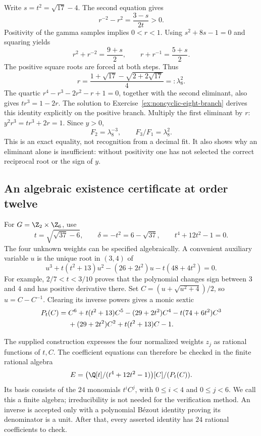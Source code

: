 Write $s=t^2=\sqrt{17}-4$. The second equation gives
\[
 r^{-2}-r^2=\frac{3-s}{2t}>0.
\]
Positivity of the gamma samples implies $0<r<1$. Using
$s^2+8s-1=0$ and squaring yields
\[
 r^2+r^{-2}=\frac{9+s}{2},\qquad
 r+r^{-1}=\frac{5+s}{2}.
\]
The positive square roots are forced at both steps. Thus
\begin{equation}
 r=\frac{1+\sqrt{17}-\sqrt{2+2\sqrt{17}}}{4}
 =:\lambda_8^2.
 \label{eq:noncyclic-lambda8}
\end{equation}
The quartic
$r^4-r^3-2r^2-r+1=0$, together with the second eliminant,
also gives $tr^3=1-2r$. The solution to
Exercise~\ref{ex:noncyclic-eight-branch} derives this identity
explicitly on the positive branch. Multiply the first eliminant by $r$:
$y^2r^3=tr^3+2r=1$. Since $y>0$,
\begin{equation}
 F_2=\lambda_8^{-3},\qquad F_3/F_1=\lambda_8^2.
 \label{eq:noncyclic-eight-gamma}
\end{equation}
This is an exact equality, not recognition from a decimal fit.
It also shows why an eliminant alone is insufficient: without
positivity one has not selected the correct reciprocal root or
the sign of $y$.

\subsection{An algebraic existence certificate at order twelve}

For $G=\Z_2\times\Z_6$, use
\[
 t=\sqrt{\sqrt{37}-6},\qquad
 \delta=-t^2=6-\sqrt{37},\qquad t^4+12t^2-1=0.
\]
The four unknown weights can be specified algebraically. A convenient
auxiliary variable $u$ is the unique root in $(3,4)$ of
\[
 u^3+t(t^2+13)u^2-(26+2t^2)u-t(48+4t^2)=0.
\]
For example, $2/7<t<3/10$ proves that the polynomial changes
sign between $3$ and $4$ and has positive derivative there.
Set $C=(u+\sqrt{u^2+4})/2$, so $u=C-C^{-1}$.
Clearing its inverse powers gives a monic sextic
\begin{align}
 P_t(C)={}&C^6+t(t^2+13)C^5-(29+2t^2)C^4
 -t(74+6t^2)C^3\notag\\
 &+(29+2t^2)C^2+t(t^2+13)C-1.
 \label{eq:noncyclic-twelve-sextic}
\end{align}

The supplied construction expresses the four normalized weights
$z_j$ as rational functions of $t,C$. The coefficient equations
can therefore be checked in the finite rational algebra
\begin{equation}
 E=\bigl(\Q[t]/(t^4+12t^2-1)\bigr)[C]/(P_t(C)).
 \label{eq:noncyclic-certificate-algebra}
\end{equation}
Its basis consists of the $24$ monomials $t^iC^j$, with
$0\leq i<4$ and $0\leq j<6$. We call this a finite algebra;
irreducibility is not needed for the verification method. An inverse
is accepted only with a polynomial B\'ezout identity proving its
denominator is a unit. After that, every asserted identity has
$24$ rational coefficients to check.


